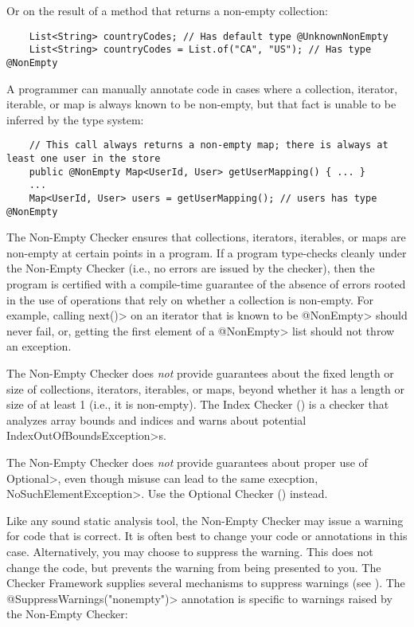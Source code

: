 Or on the result of a method that returns a non-empty collection:

\begin{Verbatim}
    List<String> countryCodes; // Has default type @UnknownNonEmpty
    List<String> countryCodes = List.of("CA", "US"); // Has type @NonEmpty
\end{Verbatim}

A programmer can manually annotate code in cases where a collection,
iterator, iterable, or map is always known to be non-empty, but that fact is
unable to be inferred by the type system:

\begin{Verbatim}
    // This call always returns a non-empty map; there is always at least one user in the store
    public @NonEmpty Map<UserId, User> getUserMapping() { ... }
    ...
    Map<UserId, User> users = getUserMapping(); // users has type @NonEmpty
\end{Verbatim}


The Non-Empty Checker ensures that collections, iterators, iterables, or maps
are non-empty at certain points in a program.
If a program type-checks cleanly under the Non-Empty Checker (i.e., no errors
are issued by the checker), then the program is certified with a compile-time
guarantee of the absence of errors rooted in the use of operations that
rely on whether a collection is non-empty.
For example, calling \<next()> on an iterator that is known to be \<@NonEmpty>
should never fail, or, getting the first element of a \<@NonEmpty> list should
not throw an exception.

The Non-Empty Checker does \emph{not} provide guarantees about the fixed
length or size of collections, iterators, iterables, or maps, beyond whether
it has a length or size of at least 1 (i.e., it is non-empty).
The Index Checker () is a checker that analyzes
array bounds and indices and warns about potential
\<IndexOutOfBoundsException>s.

The Non-Empty Checker does \emph{not} provide guarantees about proper use
of \<Optional>, even though misuse can lead to the same execption,
\<NoSuchElementException>.  Use the Optional Checker
() instead.



Like any sound static analysis tool, the Non-Empty Checker may issue a warning
for code that is correct.
It is often best to change your code or annotations in this case.
Alternatively, you may choose to suppress the warning.
This does not change the code, but prevents the warning from being presented to
you.
The Checker Framework supplies several mechanisms to suppress warnings (see
).
The \<@SuppressWarnings("nonempty")> annotation is specific to warnings raised
by the Non-Empty Checker:

